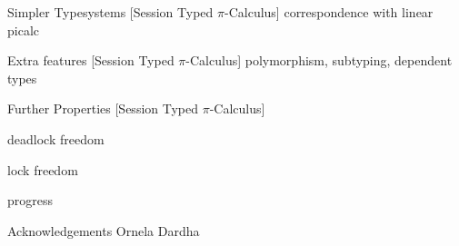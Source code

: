 \documentclass[dvipsnames]{beamer}
\newcommand{\Picalc}{$\pi$-Calculus}
\newcommand{\slidetitle}[2]{#2 \hspace*{\fill} [#1]}
\begin{document}
  \begin{frame}{\slidetitle{Session Typed \Picalc{}}{Simpler Typesystems}}
    correspondence with linear picalc
  \end{frame}

  \begin{frame}{\slidetitle{Session Typed \Picalc{}}{Extra features}}
    polymorphism, subtyping, dependent types
  \end{frame}

  \begin{frame}{\slidetitle{Session Typed \Picalc{}}{Further Properties}}
    \begin{block}{deadlock freedom}
    \end{block}
    \begin{block}{lock freedom}
    \end{block}
    \begin{block}{progress}
    \end{block}
  \end{frame}

  \begin{frame}{Acknowledgements}
    Ornela Dardha
  \end{frame}
\end{document}
